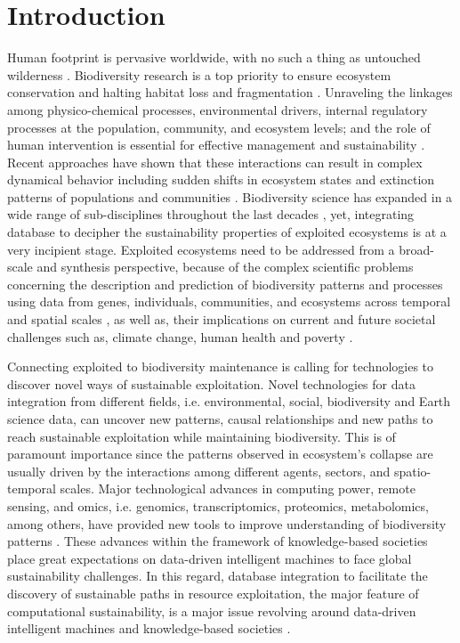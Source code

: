\documentclass[12pt,a4paper]{article}
\begin{document}
\newpage

\section{Introduction}
Human footprint is pervasive worldwide, with no such a thing as untouched wilderness \citep{marconcini2020outlining, mcdowell2020pervasive}. Biodiversity research is a top priority to ensure ecosystem conservation and halting habitat loss and fragmentation \citep{brum2017global}. Unraveling the linkages among physico-chemical processes, environmental drivers, internal regulatory processes at the population, community, and ecosystem levels; and the role of human intervention is essential for effective management and sustainability \citep{hobbs2011intervention}. Recent approaches have shown that these interactions can result in complex dynamical behavior including sudden shifts in ecosystem states and extinction patterns of populations and communities \citep{newman2019scaling}. Biodiversity science has expanded in a wide range of sub-disciplines throughout the last decades \citep{loreau2010challenges}, yet, integrating database to decipher the sustainability properties of exploited ecosystems is at a very incipient stage. Exploited ecosystems need to be addressed from a broad-scale and synthesis perspective, because of the complex scientific problems concerning the description and prediction of biodiversity patterns and processes using data from genes, individuals, communities, and ecosystems across temporal and spatial scales \citep{chase2018embracing}, as well as, their implications on current and future societal challenges such as, climate change, human health and poverty \citep{cardinale2012biodiversity, turner2012global}.

Connecting exploited to biodiversity maintenance is calling for technologies to discover novel ways of sustainable exploitation. Novel technologies for data integration from different fields, i.e. environmental, social, biodiversity and Earth science data, can uncover new patterns, causal relationships and new paths to reach sustainable exploitation while maintaining biodiversity. This is of paramount importance since the patterns observed in ecosystem's collapse are usually driven by the interactions among different agents, sectors, and spatio-temporal scales.
Major technological advances in computing power, remote sensing, and omics, i.e. genomics, transcriptomics, proteomics, metabolomics, among others, have provided new tools to improve understanding of biodiversity patterns \citep{craven2019evolution}. These advances within the framework of knowledge-based societies place great expectations on data-driven intelligent machines to face global sustainability challenges. In this regard, database integration to facilitate the discovery of sustainable paths in resource exploitation, the major feature of computational sustainability, is a major issue revolving around data-driven intelligent machines and knowledge-based societies \citep{Gomesetal2019}. 
\end{document}
